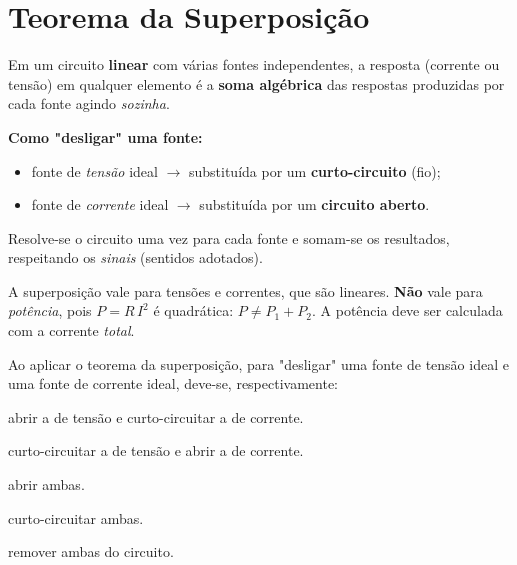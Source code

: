 \section{Teorema da Superposição}

\begin{conceito}
Em um circuito \textbf{linear} com várias fontes independentes, a resposta
(corrente ou tensão) em qualquer elemento é a \textbf{soma algébrica} das
respostas produzidas por cada fonte agindo \emph{sozinha}.\par
\textbf{Como "desligar" uma fonte:}
\begin{itemize}[leftmargin=1.6em,itemsep=1pt,topsep=2pt]
\item fonte de \emph{tensão} ideal $\to$ substituída por um \textbf{curto-circuito}
      (fio);
\item fonte de \emph{corrente} ideal $\to$ substituída por um \textbf{circuito
      aberto}.
\end{itemize}
Resolve-se o circuito uma vez para cada fonte e somam-se os resultados, respeitando
os \emph{sinais} (sentidos adotados).
\end{conceito}

\begin{atencao}
A superposição vale para tensões e correntes, que são lineares. \textbf{Não} vale
para \emph{potência}, pois $P = R\,I^2$ é quadrática:
$P \neq P_1 + P_2$. A potência deve ser calculada com a corrente \emph{total}.
\end{atencao}

\legendaniveis

\blocofixacao

\begin{questao}[1]{}
Ao aplicar o teorema da superposição, para "desligar" uma fonte de tensão ideal e
uma fonte de corrente ideal, deve-se, respectivamente:
\begin{alternativas}
\item abrir a de tensão e curto-circuitar a de corrente.
\item curto-circuitar a de tensão e abrir a de corrente.
\item abrir ambas.
\item curto-circuitar ambas.
\item remover ambas do circuito.
\end{alternativas}
\end{questao}


